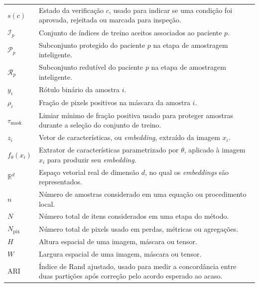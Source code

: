 \begin{longtable}{p{3.0cm}p{12.0cm}}
  $s(c)$ &
  Estado da verificação $c$, usado para indicar se uma condição foi aprovada,
  rejeitada ou marcada para inspeção.\\

  $\mathcal{I}_p$ &
  Conjunto de índices de treino aceitos associados ao paciente $p$.\\

  $\mathcal{P}_p$ &
  Subconjunto protegido do paciente $p$ na etapa de amostragem inteligente.\\

  $\mathcal{R}_p$ &
  Subconjunto redutível do paciente $p$ na etapa de amostragem inteligente.\\

  $y_i$ &
  Rótulo binário da amostra $i$.\\

  $\rho_i$ &
  Fração de pixels positivos na máscara da amostra $i$.\\

  $\tau_{\mathrm{mask}}$ &
  Limiar mínimo de fração positiva usado para proteger amostras durante a
  seleção do conjunto de treino.\\

  $z_i$ &
  Vetor de características, ou \textit{embedding}, extraído da imagem $x_i$.\\

  $f_\theta(x_i)$ &
  Extrator de características parametrizado por $\theta$, aplicado à imagem
  $x_i$ para produzir seu \textit{embedding}.\\

  $\mathbb{R}^d$ &
  Espaço vetorial real de dimensão $d$, no qual os \textit{embeddings} são
  representados.\\

  $n$ &
  Número de amostras considerado em uma equação ou procedimento local.\\

  $N$ &
  Número total de itens considerados em uma etapa do método.\\

  $N_{\mathrm{pix}}$ &
  Número total de pixels usado em perdas, métricas ou agregações.\\

  $H$ &
  Altura espacial de uma imagem, máscara ou tensor.\\

  $W$ &
  Largura espacial de uma imagem, máscara ou tensor.\\

  $\mathrm{ARI}$ &
  Índice de Rand ajustado, usado para medir a concordância entre duas partições
  após correção pelo acordo esperado ao acaso.\\


\end{longtable}
